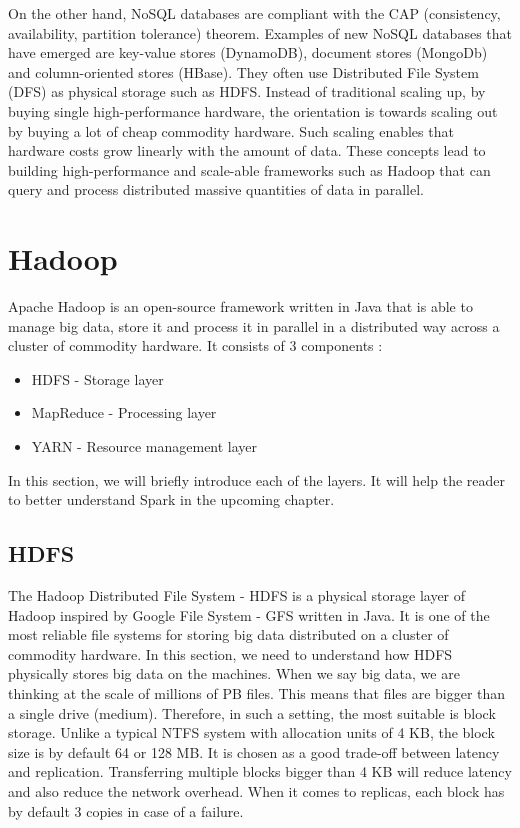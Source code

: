 On the other hand, NoSQL databases are compliant with the CAP (consistency, availability, partition tolerance) theorem.  Examples of new NoSQL databases that have emerged are key-value stores (DynamoDB), document stores (MongoDb) and column-oriented stores (HBase). They often use Distributed File System (DFS) as physical storage such as HDFS. Instead of traditional scaling up, by buying single high-performance hardware, the orientation is towards scaling out by buying a lot of cheap commodity hardware. Such scaling enables that hardware costs grow linearly with the amount of data.  These concepts lead to building high-performance and scale-able frameworks such as Hadoop that can query and process distributed massive quantities of data in parallel. \cite{BigDataCourse} %

\section{Hadoop}
Apache Hadoop \cite{Hadoop} is an open-source framework written in Java that is able to manage big data, store it and process it in parallel in a distributed way across a cluster of commodity hardware. It consists of 3 components \cite{BigDataCourse}: %
\begin{itemize}
	\item HDFS - Storage layer
	\item MapReduce - Processing layer
	\item YARN - Resource management layer
\end{itemize}

In this section, we will briefly introduce each of the layers. It will help the reader to better understand Spark in the upcoming chapter.

\subsection{HDFS}
The Hadoop Distributed File System - HDFS \cite{HDFS} is a physical storage layer of Hadoop inspired by Google File System - GFS \cite{GFS} written in Java. It is one of the most reliable file systems for storing big data distributed on a cluster of commodity hardware. In this section, we need to understand how HDFS physically stores big data on the machines. When we say big data, we are thinking at the scale of millions of PB files. This means that files are bigger than a single drive (medium). Therefore, in such a setting, the most suitable is block storage. Unlike a typical NTFS system with allocation units of 4 KB, the block size is by default 64 or 128 MB. It is chosen as a good trade-off between latency and replication. Transferring multiple blocks bigger than 4 KB will reduce latency and also reduce the network overhead. When it comes to replicas, each block has by default 3 copies in case of a failure.  

